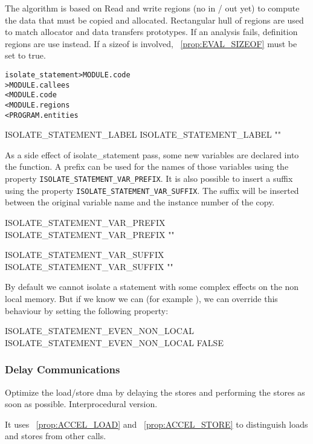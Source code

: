 \documentclass[a4paper]{report}
\newenvironment{PipsMake}{\begin{alltt}}{\end{alltt}}
\newcommand{\PipsPropRef}[1]{\texttt{\detokenize{#1}}~\ref{prop:#1}}
\newenvironment{PipsPass}[1]{\label{pass:#1}}{}
\begin{document}
The algorithm is based on Read and write regions (no in / out yet) to compute
the data that must be copied and allocated.
Rectangular hull of regions are used to match allocator and data transfers prototypes.
If an analysis fails, definition regions are use instead.
If a sizeof is involved, \PipsPropRef{EVAL_SIZEOF} must be set to true.


\begin{PipsMake}
isolate_statement > MODULE.code
	> MODULE.callees
	< MODULE.code
	< MODULE.regions
	< PROGRAM.entities
\end{PipsMake}

\begin{PipsProp}{ISOLATE_STATEMENT_LABEL}
ISOLATE_STATEMENT_LABEL ""
\end{PipsProp}

As a side effect of isolate\_statement pass, some new variables are declared
into the function. A prefix can be used for the names of those variables
using the property \texttt{ISOLATE\_STATEMENT\_VAR\_PREFIX}. It is also possible to
insert a suffix using the property \texttt{ISOLATE\_STATEMENT\_VAR\_SUFFIX}.
The suffix will be inserted between the original variable name
and the instance number of the copy.
\begin{PipsProp}{ISOLATE_STATEMENT_VAR_PREFIX}
ISOLATE_STATEMENT_VAR_PREFIX ""
\end{PipsProp}
\begin{PipsProp}{ISOLATE_STATEMENT_VAR_SUFFIX}
ISOLATE_STATEMENT_VAR_SUFFIX ""
\end{PipsProp}

By default we cannot isolate a statement with some complex effects on
the non local memory. But if we know we can (for example ), we can override this
behaviour by setting the following property:
\begin{PipsProp}{ISOLATE_STATEMENT_EVEN_NON_LOCAL}
ISOLATE_STATEMENT_EVEN_NON_LOCAL FALSE
\end{PipsProp}

\subsubsection{Delay Communications}
\begin{PipsPass}{delay_communications_inter}
Optimize the load/store dma by delaying the stores and
performing the stores as soon as possible. Interprocedural version.
\end{PipsPass}

It uses \PipsPropRef{ACCEL_LOAD} and \PipsPropRef{ACCEL_STORE}
to distinguish loads and stores from other calls.
\end{document}
